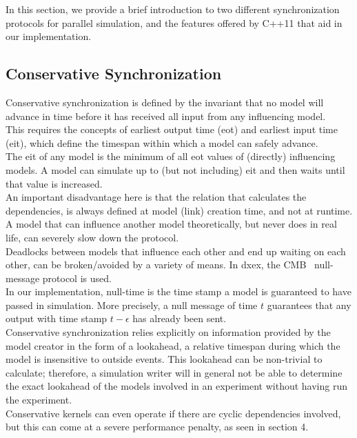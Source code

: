In this section, we provide a brief introduction to two different synchronization protocols for parallel simulation, and the features offered by C++11 that aid in our implementation.

\subsection{Conservative Synchronization}
Conservative synchronization is defined by the invariant that no model will advance in time before it has received all input from any influencing model. \\
This requires the concepts of earliest output time (eot) and earliest input time (eit), which define the timespan within which a model can safely advance.\\
The eit of any model is the minimum of all eot values of (directly) influencing models. A model can simulate up to (but not including) eit and then waits until that value is increased. \\
An important disadvantage here is that the relation that calculates the dependencies, is always defined at model (link) creation time, and not at runtime. A model that can influence another model theoretically, but never does in real life, can severely slow down the protocol. \\
Deadlocks between models that influence each other and end up waiting on each other, can be broken/avoided by a variety of means. In dxex, the CMB~\cite{Chandy:1981:ADS:358598.358613} null-message protocol is used. \\
In our implementation, null-time is the time stamp a model is guaranteed to have passed in simulation. More precisely, a null message of time $t$ guarantees that any output with time stamp $t-\epsilon$ has already been sent.\\
Conservative synchronization relies explicitly on information provided by the model creator in the form of a lookahead, a relative timespan during which the model is insensitive to outside events. This lookahead can be non-trivial to calculate; therefore, a simulation writer will in general not be able to determine the exact lookahead of the models involved in an experiment without having run the experiment.\\
Conservative kernels can even operate if there are cyclic dependencies involved, but this can come at a severe performance penalty, as seen in section 4.

